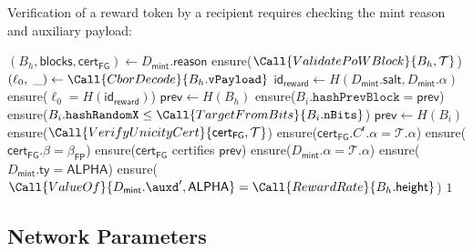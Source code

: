 Verification of a reward token by a recipient requires checking the mint reason and auxiliary payload:

\begin{algorithm}[!htbp]
  \caption{Block Reward Mint Reason Verification}\label{alg:pow-reward-verify}
  \begin{algorithmic}[0]
      \State $(B_h, \mathsf{blocks}, \mathsf{cert}_\mathsf{FG}) \gets D_\mathsf{mint}.\mathsf{reason}$
      \State
      \State {}
      \State ensure($\Call{ValidatePoWBlock}{B_h, \mathcal{T}}$)
      \State $(\ell_0,\; \_) \gets \Call{CborDecode}{B_h.\texttt{vPayload}}$
      \State $\mathsf{id}_\mathsf{reward} \gets H(D_\mathsf{mint}.\mathsf{salt}, D_\mathsf{mint}.\alpha)$ 
      \State ensure($\ell_0 = H(\mathsf{id}_\mathsf{reward})$) 
      \State
      \State {}
      \State $\mathsf{prev} \gets H(B_h)$ 
        \State ensure($B_i.\texttt{hashPrevBlock} = \mathsf{prev}$)
        \State ensure($B_i.\texttt{hashRandomX} \le \Call{TargetFromBits}{B_i.\texttt{nBits}}$) 
        \State $\mathsf{prev} \gets H(B_i)$ 
      \EndFor
      \State
      \State {}
      \State ensure($\Call{VerifyUnicityCert}{\mathsf{cert}_\mathsf{FG}, \mathcal{T}}$)
      \State ensure($\mathsf{cert}_\mathsf{FG}.C^\mathsf{r}.\alpha = \mathcal{T}.\alpha$)
      \State ensure($\mathsf{cert}_\mathsf{FG}.\beta = \beta_\mathsf{FP}$) 
      \State ensure($\mathsf{cert}_\mathsf{FG}$ certifies $\mathsf{prev}$) 
      \State
      \State {}
      \State ensure($D_\mathsf{mint}.\alpha = \mathcal{T}.\alpha$)
      \State ensure($D_\mathsf{mint}.\mathsf{ty} = \mathsf{ALPHA}$)
      \State ensure($\Call{ValueOf}{D_\mathsf{mint}.\auxd', \mathsf{ALPHA}} = \Call{RewardRate}{B_h.\mathsf{height}}$)
      \State \Return $1$
    \EndFunction
  \end{algorithmic}
\end{algorithm}


\subsection{Network Parameters}\label{sec:pow-network}

